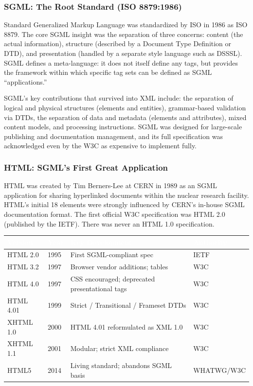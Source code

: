 \documentclass[11pt,letterpaper]{article}
\newcommand{\tableheader}[1]{\textbf{\sffamily\textcolor{white}{#1}}}
\begin{document}
\subsubsection{SGML: The Root Standard (ISO 8879:1986)}

Standard Generalized Markup Language was standardized by ISO in 1986 as ISO 8879. The core SGML insight was the separation of three concerns: content (the actual information), structure (described by a Document Type Definition or DTD), and presentation (handled by a separate style language such as DSSSL). SGML defines a meta-language: it does not itself define any tags, but provides the framework within which specific tag sets can be defined as SGML ``applications.''

SGML's key contributions that survived into XML include: the separation of logical and physical structures (elements and entities), grammar-based validation via DTDs, the separation of data and metadata (elements and attributes), mixed content models, and processing instructions. SGML was designed for large-scale publishing and documentation management, and its full specification was acknowledged even by the W3C as expensive to implement fully.

\subsubsection{HTML: SGML's First Great Application}

HTML was created by Tim Berners-Lee at CERN in 1989 as an SGML application for sharing hyperlinked documents within the nuclear research facility. HTML's initial 18 elements were strongly influenced by CERN's in-house SGML documentation format. The first official W3C specification was HTML 2.0 (published by the IETF). There was never an HTML 1.0 specification.

\begin{center}
\begin{tabularx}{\textwidth}{L{2.5cm}L{2.5cm}XC{2cm}}
\toprule
{}
\tableheader{Version} & \tableheader{Year} & \tableheader{Key Development} & \tableheader{Authority} \\
\midrule
HTML 2.0 & 1995 & First SGML-compliant spec & IETF \\
HTML 3.2 & 1997 & Browser vendor additions; tables & W3C \\
HTML 4.0 & 1997 & CSS encouraged; deprecated presentational tags & W3C \\
HTML 4.01 & 1999 & Strict / Transitional / Frameset DTDs & W3C \\
XHTML 1.0 & 2000 & HTML 4.01 reformulated as XML 1.0 & W3C \\
XHTML 1.1 & 2001 & Modular; strict XML compliance & W3C \\
HTML5 & 2014 & Living standard; abandons SGML basis & WHATWG/W3C \\
\bottomrule
\end{tabularx}
\end{center}
\end{document}
